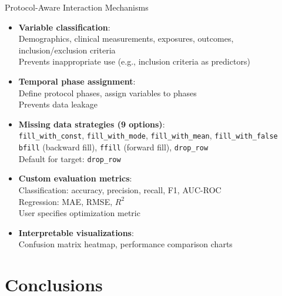 \documentclass[aspectratio=169,10pt,english,dvipsnames]{beamer}
\begin{document}
\begin{frame}{Protocol-Aware Interaction Mechanisms}
    \begin{itemize}
        \item \textbf{Variable classification}:\\
        Demographics, clinical measurements, exposures, outcomes, inclusion/exclusion criteria\\
        Prevents inappropriate use (e.g., inclusion criteria as predictors)
        
        \item \textbf{Temporal phase assignment}:\\
        Define protocol phases, assign variables to phases\\
        Prevents data leakage
        
        \item \textbf{Missing data strategies (9 options)}:\\
        \texttt{fill\_with\_const}, \texttt{fill\_with\_mode}, \texttt{fill\_with\_mean}, \texttt{fill\_with\_false}\\
        \texttt{bfill} (backward fill), \texttt{ffill} (forward fill), \texttt{drop\_row}\\
        Default for target: \texttt{drop\_row}
        
        \item \textbf{Custom evaluation metrics}:\\
        Classification: accuracy, precision, recall, F1, AUC-ROC\\
        Regression: MAE, RMSE, $R^2$\\
        User specifies optimization metric
        
        \item \textbf{Interpretable visualizations}:\\
        Confusion matrix heatmap, performance comparison charts
    \end{itemize}
\end{frame}


\section{Conclusions}
\end{document}
